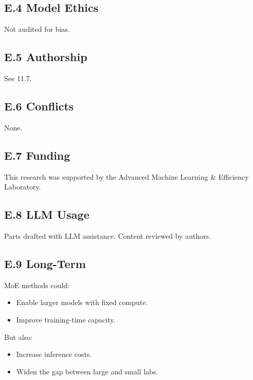 \subsection{E.4 Model Ethics}

Not audited for bias.

\subsection{E.5 Authorship}

See  11.7.

\subsection{E.6 Conflicts}

None.

\subsection{E.7 Funding}

This research was supported by the Advanced Machine Learning \& Efficiency Laboratory.

\subsection{E.8 LLM Usage}

Parts drafted with LLM assistance. Content reviewed by authors.

\subsection{E.9 Long-Term}

MoE methods could:
\begin{itemize}
\item Enable larger models with fixed compute.
\item Improve training-time capacity.

\end{itemize}
But also:
\begin{itemize}
\item Increase inference costs.
\item Widen the gap between large and small labs.

\end{itemize}
